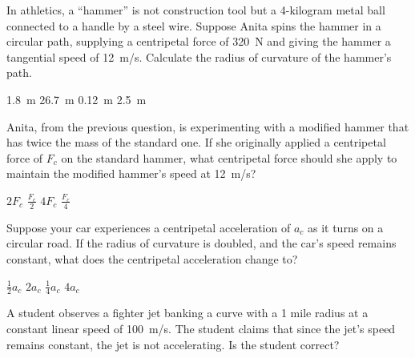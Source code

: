 \documentclass[answers]{exam}
\begin{document}
\begin{questions}
\question \label{N3JMlC}
In athletics, a ``hammer'' is not construction tool but a 4-kilogram metal ball connected to a handle by a steel wire. Suppose Anita spins the hammer in a circular path, supplying a centripetal force of \SI{320}{N} and giving the hammer a tangential speed of \SI{12}{m/s}. Calculate the radius of curvature of the hammer's path.

\begin{center}
\end{center}

\begin{randomizechoices}
    \correctchoice \SI{1.8}{m}
    \choice \SI{26.7}{m}
    \choice \SI{0.12}{m}
    \choice \SI{2.5}{m}
\end{randomizechoices}

\question 
Anita, from the previous question, is experimenting with a modified hammer that has twice the mass of the standard one. If she originally applied a centripetal force of $F_c$ on the standard hammer, what centripetal force should she apply to maintain the modified hammer's speed at \SI{12}{m/s}?

\begin{randomizechoices}
    \correctchoice $2 F_c$
    \choice $\frac{F_c}{2}$
    \choice $4 F_c$
    \choice $\frac{F_c}{4}$
\end{randomizechoices}


\question
Suppose your car experiences a centripetal acceleration of $a_c$ as it turns on a circular road. If the radius of curvature is doubled, and the car's speed remains constant, what does the centripetal acceleration change to?

\begin{randomizechoices}
    \correctchoice $\frac{1}{2} a_c$
    \choice $2 a_c$
    \choice $\frac{1}{4} a_c$
    \choice $4 a_c$
\end{randomizechoices}

\question
A student observes a fighter jet banking a curve with a 1 mile radius at a constant linear speed of \SI{100}{m/s}. The student claims that since the jet's speed remains constant, the jet is not accelerating. Is the student correct?


\end{questions}
\end{document}

